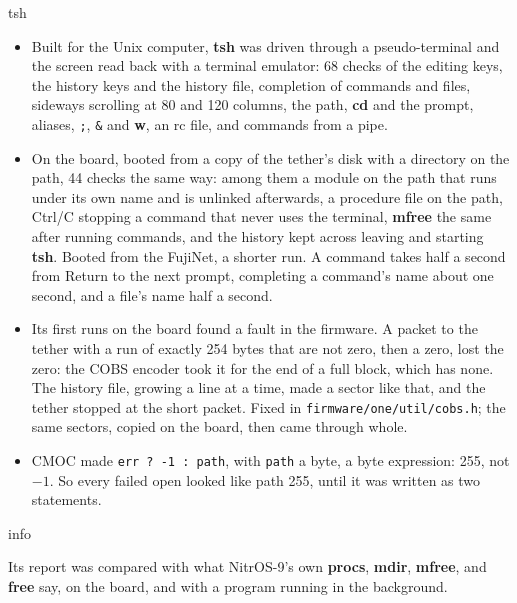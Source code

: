 \documentclass[10pt,twoside,openany]{book}
\makeatletter
\newcommand{\cmd}[1]{\textbf{#1}}            %
\newcommand{\file}[1]{\texttt{#1}}           %
\newcommand{\key}[1]{\textsf{\small #1}}     %
\renewcommand{\section}{\@startsection{section}{1}{0pt}{3.2ex plus 1ex}{1.2ex}%
  {\sffamily\bfseries\large}}
\makeatother
\begin{document}
\section{tsh}

\begin{itemize}\setlength{\itemsep}{0.3ex}
\item Built for the Unix computer, \cmd{tsh} was driven through a
pseudo-terminal and the screen read back with a terminal emulator: 68
checks of the editing keys, the history keys and the history file,
completion of commands and files, sideways scrolling at 80 and 120
columns, the path, \cmd{cd} and the prompt, aliases, \texttt{;},
\texttt{\&} and \cmd{w}, an rc file, and commands from a pipe.
\item On the board, booted from a copy of the tether's disk with a
directory on the path, 44 checks the same way: among them a module on
the path that runs under its own name and is unlinked afterwards, a
procedure file on the path, \key{Ctrl/C} stopping a command that never
uses the terminal, \cmd{mfree} the same after running commands, and the
history kept across leaving and starting \cmd{tsh}. Booted from the
FujiNet, a shorter run. A command takes half a second from \key{Return}
to the next prompt, completing a command's name about one second, and a
file's name half a second.
\item Its first runs on the board found a fault in the firmware. A packet
to the tether with a run of exactly 254 bytes that are not zero, then a
zero, lost the zero: the COBS encoder took it for the end of a full
block, which has none. The history file, growing a line at a time, made
a sector like that, and the tether stopped at the short packet. Fixed in
\file{firmware/one/util/cobs.h}; the same sectors, copied on the board,
then came through whole.
\item CMOC made \texttt{err ? -1 : path}, with \texttt{path} a byte, a
byte expression: 255, not $-1$. So every failed open looked like path
255, until it was written as two statements.
\end{itemize}

\section{info}

Its report was compared with what NitrOS-9's own \cmd{procs}, \cmd{mdir},
\cmd{mfree}, and \cmd{free} say, on the board, and with a program running
in the background.
\end{document}

